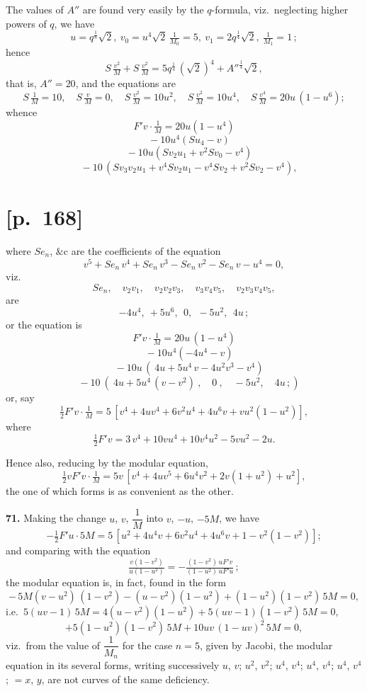 \documentclass[11pt]{article}
\begin{document}
The values of $A''$ are found very easily by the $q$-formula, viz.\ neglecting higher
powers of $q$, we have
\[
u=q^{\frac{1}{8}}\sqrt{2},\ v_0=u^4\sqrt{2}\,\tfrac{1}{M_0}=5,\ v_1=2q^{\frac{1}{4}}\sqrt{2},\ \tfrac{1}{M_1}=1\,;
\]
hence
\[
S\,\tfrac{v^2}{M}+S\,\tfrac{v^2}{M}=5q^{\frac{1}{4}}\,(\sqrt{2})^4+A''^{\frac{1}{4}}\sqrt{2},
\]
that is, $A''=20$, and the equations are
\[
S\,\tfrac{1}{M}=10,\quad S\,\tfrac{v}{M}=0,\quad S\,\tfrac{v^2}{M}=10u^2,\quad S\,\tfrac{v^2}{M}=10u^4,\quad S\,\tfrac{v^4}{M}=20u\,(1-u^6);
\]
whence
\[
F'v\cdot\tfrac{1}{M}=20u(1-u^4)
\]
\[
\quad-10u^4(Su_4-v)
\]
\[
\quad-10u(S v_2u_1+v^2S v_0-v^4)
\]
\[
\quad-10\,(S v_3v_2u_1+v^4 S v_2u_1-v^4 S v_2+v^2S v_2-v^4),
\]

\section*{[p.~168]}
where $S e_n$, $\&\text{c}$ are the coefficients of the equation
\[
v^5+S e_n\,v^4+S e_n\,v^3-S e_n\,v^2-S e_n\,v-u^4=0,
\]
viz.
\[
S e_n,\quad v_2v_1,\quad v_2v_2v_3,\quad v_3v_4v_5,\quad v_2v_3v_4v_5,
\]
are
\[
-4u^4,\ +5u^6,\ \ 0,\ \ -5u^2,\ \ 4u\,;
\]
or the equation is
\[
F'v\cdot\tfrac{1}{M}=20u\,(1-u^4)
\]
\[
\quad-10u^4(-4u^4-v)
\]
\[
\quad-10u\,(\ 4u+5u^4\,v-4u^2v^3-v^4)
\]
\[
\quad-10\ (\ 4u+5u^4\,(v-v^2)\ ,\quad 0\ ,\quad -5u^2,\quad 4u\,;)
\]
or, say
\[
\tfrac{1}{2}F'v\cdot\tfrac{1}{M}=5\,[v^4+4uv^4+6v^2u^4+4u^6v+vu^2(1-u^2)],
\]
where
\[
\tfrac{1}{2}F'v=3\,v^4+10vu^4+10v^4u^2-5vu^2-2u.
\]

Hence also, reducing by the modular equation,
\[
\tfrac{1}{2}vF'v\cdot\tfrac{1}{M}=5v\,[v^4+4uv^5+6u^4v^2+2v(1+u^2)+u^2],
\]
the one of which forms is as convenient as the other.

\medskip
\noindent\textbf{71.} Making the change $u$, $v$, $\dfrac{1}{M}$ into $v$, $-u$, $-5M$, we have
\[
-\tfrac{1}{2}F'u\cdot 5M=5\,[u^2+4u^4v+6v^2u^4+4u^6v+1-v^2(1-v^2)];
\]
and comparing with the equation
\[
\tfrac{v(1-v^2)}{u(1-u^2)}=-\tfrac{(1-v^2)\,uF'v}{(1-u^2)\,uF'u}\,;
\]
the modular equation is, in fact, found in the form
\[
-\,5M(v-u^2)\,(1-v^2)-(u-v^2)(1-u^2)+(1-u^2)(1-v^2)\,5M=0,
\]
i.e.\ $5(uv-1)\,5M=4(u-v^2)(1-u^2)+5(uv-1)(1-v^2)\,5M=0,$
\[
+5(1-u^2)(1-v^2)\,5M+10uv\,(1-uv)^2\,5M=0,
\]
viz.\ from the value of $\dfrac{1}{M_n}$ for the case $n=5$, given by Jacobi, the modular equation
in its several forms, writing successively $u$, $v$; $u^2$, $v^2$; $u^4$, $v^4$; $u^4$, $v^4$; $u^4$, $v^4$; $=x$, $y$,
are not curves of the same deficiency.
\end{document}
